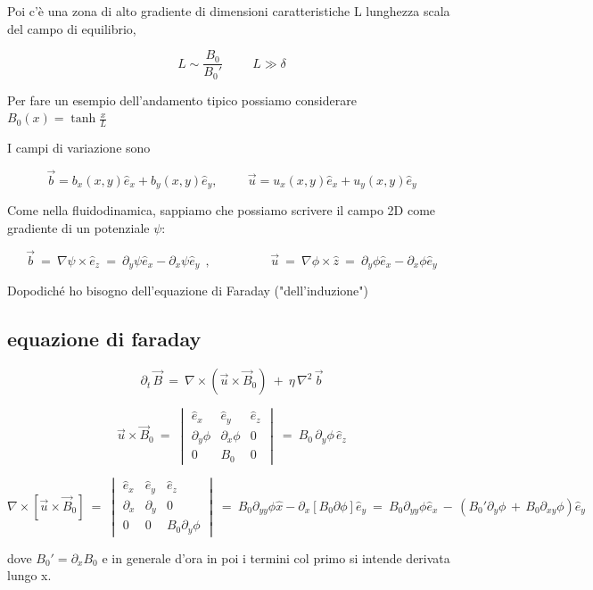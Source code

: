Poi c'è una zona di alto gradiente di dimensioni caratteristiche L lunghezza scala del campo di equilibrio, 

\[L\sim\frac{B_0}{B_0'} \hspace{1cm}L\gg\delta\]

Per fare un esempio dell'andamento tipico possiamo considerare  $B_0(x)=\tanh{\frac{x}{L}}$ 

I campi di variazione sono 

\[\vec b=b_x(x,y)\hat e_x+b_y(x,y)\hat e_y,\hspace{1cm}\vec u=u_x(x,y)\hat e_x+u_y(x,y)\hat e_y\] 

Come nella fluidodinamica, sappiamo che possiamo scrivere il campo 2D come gradiente di un potenziale $\psi$:

\[\boxed{\vec b\ =\ \nabla\psi\times\hat e_z\ =\ \partial_y\psi\hat e_x-\partial_x\psi\hat e_y}\ \ ,\hspace{2cm} \boxed{\vec u\ =\ \nabla\phi\times\hat z\ =\ \partial_y\phi\hat e_x-\partial_x\phi\hat e_y}\] 

Dopodiché ho bisogno dell'equazione di Faraday ("dell'induzione") 


%
%
%
\subsection{equazione di faraday}  

\[\boxed{\, \partial_t\, \vec B\ =\ \nabla\times(\vec u\times\vec B_0)\ +\ \eta\,\nabla^2\,\vec b\, }\]

\[\vec u\times\vec B_0\ =\ 
\begin{vmatrix} 
	\hat e_x & \hat e_y & \hat e_z\\ 
	\partial_y\phi & \partial_x\phi & 0\\
	0& B_0 &  0
\end{vmatrix} 
\ =\ B_0\,\partial_y\phi\,\hat e_z\] 

\[\nabla\times[\vec u\times\vec B_0]\ =\ 
\begin{vmatrix} 
	\hat e_x & \hat e_y & \hat e_z\\ 
	\partial_x & \partial_y & 0\\
	0& 0 &  B_0\partial_y\phi
\end{vmatrix} 
\ =\ B_0\partial_{yy}\phi\hat x-\partial_x[B_0\partial \phi]\hat e_y\ =\ B_0\partial_{yy}\phi\hat e_x\, -\, (B_0'\partial_y\phi\, +\, B_0\partial_{xy}\phi)\hat e_y\] 

dove $B_0'=\partial_ xB_0$ e in generale d'ora in poi i termini col primo si intende derivata lungo x. 


